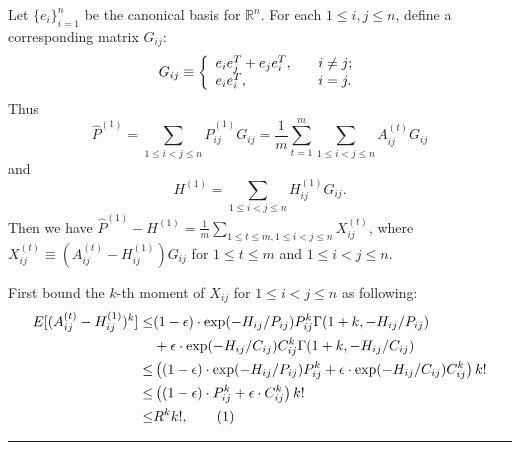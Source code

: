 \documentclass[a4paper]{article}
\newenvironment{proof}{{\bf Proof:  }}{\hfill\rule{2mm}{2mm}}
\begin{document}
\noindent
\begin{proof}
Let $\{e_i\}_{i=1}^n$ be the canonical basis for $\mathbb{R}^n$. For each $1 \le i, j \le n$, define a corresponding matrix $G_{ij}$:
\[
    G_{ij} \equiv \left\{
    \begin{array}{l l}
        e_i e_j^T + e_j e_i^T, \quad & i \ne j;\\
        e_i e_i^T, \quad & i = j.
    \end{array}
    \right.
\]
Thus
\[
\hat{P}^{(1)} = \sum_{1 \le i < j \le n} \hat{P}^{(1)}_{ij} G_{ij} = \frac{1}{m}\sum_{t=1}^m \sum_{1 \le i < j \le n} A^{(t)}_{ij} G_{ij}
\]
and
\[
H^{(1)} = \sum_{1 \le i < j \le n} H^{(1)}_{ij} G_{ij}.
\]
Then we have $\hat{P}^{(1)} - H^{(1)} = \frac{1}{m} \sum_{1 \le t \le m, 1 \le i < j \le n} X_{ij}^{(t)}$, where $X_{ij}^{(t)} \equiv \left( A^{(t)}_{ij} - H^{(1)}_{ij} \right) G_{ij}$ for $1 \le t \le m$ and $1 \le i < j \le n$.

First bound the $k$-th moment of $X_{ij}$ for $1 \le i < j \le n$ as following:
\begin{align*}
	E[(A^{(t)}_{ij} - H^{(1)}_{ij})^k]
    \le & (1-\epsilon) \cdot \exp(-H_{ij}/P_{ij}) P_{ij}^k \Gamma(1+k, -H_{ij}/P_{ij}) \\
    & + \epsilon \cdot \exp(-H_{ij}/C_{ij}) C_{ij}^k \Gamma(1+k, -H_{ij}/C_{ij}) \\
    \le & \left( (1-\epsilon) \cdot \exp(-H_{ij}/P_{ij}) P_{ij}^k + \epsilon \cdot \exp(-H_{ij}/C_{ij}) C_{ij}^k \right) k! \\
    \le & \left( (1-\epsilon) \cdot P_{ij}^k + \epsilon \cdot C_{ij}^k \right) k! \\
    \le & R^k k!,
    \stepcounter{equation}\tag{\theequation}\label{eqn:expectpdiffqpowerkL1}
\end{align*}


\end{proof}
\end{document}
